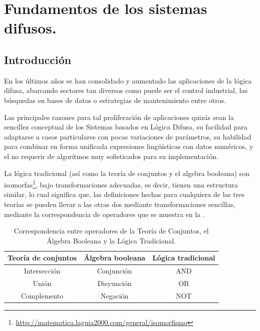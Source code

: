 \section{Fundamentos de los sistemas difusos.}

\subsection{Introducción}
En los últimos años se han consolidado y aumentado las aplicaciones de la lógica difusa, abarcando sectores tan diversos como puede ser el control industrial, las búsquedas en bases de datos o estrategias de mantenimiento entre otros.

Las principales razones para tal proliferación de aplicaciones quizás sean la
sencillez conceptual de los Sistemas basados en Lógica Difusa, su facilidad
para adaptarse a casos particulares con pocas variaciones de parámetros,
su habilidad para combinar en forma unificada expresiones lingüísticas con
datos numéricos, y el no requerir de algoritmos muy sofisticados para su
implementación.

La lógica tradicional (así como la teoría de conjuntos y el algebra booleana) son isomorfas\footnote{\url{http://matematica.laguia2000.com/general/isomorfismo}}, bajo transformaciones adecuadas, es decir, tienen una estructura similar, lo cual significa que, las definiciones hechas para cualquiera de las tres teorías se pueden llevar a las otras dos mediante transformaciones sencillas, mediante la correspondencia de operadores que se muestra en la .



\begin{table}[h]
	\centering
	\begin{tabular}{@{}ccc@{}}
		\toprule
		\multicolumn{1}{l}{\textbf{Teoría de conjuntos}} & \multicolumn{1}{l}{\textbf{Álgebra booleana}} & \multicolumn{1}{l}{\textbf{Lógica tradicional}} \\ \midrule
		\multicolumn{1}{c}{Intersección}               & \multicolumn{1}{c}{Conjunción}               & \multicolumn{1}{c}{AND}                        \\ \midrule
		\multicolumn{1}{c}{Unión}                      & \multicolumn{1}{c}{Disyunción}               & \multicolumn{1}{c}{OR}                         \\ \midrule
		Complemento                                      & Negación                                      & NOT                                             \\ \bottomrule
	\end{tabular}
	\caption{Correspondencia entre operadores de la Teoría de Conjuntos, el Álgebra Booleana y la Lógica Tradicional.}
	\label{table:1}
\end{table}

